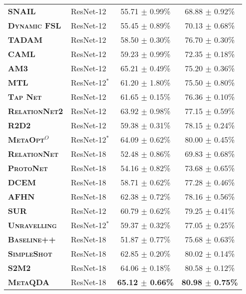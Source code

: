 \documentclass[10pt,twocolumn,letterpaper]{article}
\begin{document}
\begin{table}[h]
{\begin{tabular}{@{} llcc @{}}
\midrule

\textbf{\textsc{SNAIL}} \cite{santoro2017simple} & ResNet-12 & 55.71 $\pm$ 0.99\% & 68.88 $\pm$ 0.92\% \\ 
\textbf{\textsc{Dynamic FSL}} \cite{gidaris2018dynamic} & ResNet-12& 55.45 $\pm$ 0.89\% & 70.13 $\pm$ 0.68\% \\ 
\textbf{\textsc{TADAM}} \cite{oreshkin2018tadam} & ResNet-12 & 58.50 $\pm$ 0.30\% & {76.70 $\pm$ 0.30\%} \\
\textbf{\textsc{CAML}} \cite{jiang2019CAML} & ResNet-12 &  59.23 $\pm$ 0.99\% & 72.35 $\pm$ 0.18\% \\
\textbf{\textsc{AM3}} \cite{xing2019am3} & ResNet-12 & 65.21 $\pm$ 0.49\% & 75.20 $\pm$ 0.36\% \\
\textbf{\textsc{MTL}} \cite{sun2019meta} & ResNet-12$^*$ & 61.20 $\pm$ 1.80\% & 75.50 $\pm$ 0.80\% \\
\textbf{\textsc{Tap Net}} \cite{yoon2019tapnet} & ResNet-12 & 61.65 $\pm$ 0.15\% & 76.36 $\pm$ 0.10\% \\
\textbf{\textsc{RelationNet2}}\cite{xueting2020dcn} & ResNet-12 & 63.92 $\pm$ 0.98\% & 77.15 $\pm$ 0.59\% \\
\textbf{\textsc{R2D2}}\cite{bertinetto2019R2D2} & ResNet-12 & 59.38 $\pm$ 0.31\% & 78.15 $\pm$ 0.24\% \\
\textbf{\textsc{MetaOpt}}$^{O}$ \cite{lee2019meta} & ResNet-12$^*$ & 64.09 $\pm$ 0.62\% & 80.00 $\pm$ 0.45\% \\

\textbf{\textsc{RelationNet}} \cite{chen2019closerfewshot} & ResNet-18 &  52.48 $\pm$ 0.86\% & 69.83 $\pm$ 0.68\% \\
\textbf{\textsc{ProtoNet}} \cite{chen2019closerfewshot} & ResNet-18 &  54.16 $\pm$ 0.82\% & 73.68 $\pm$ 0.65\% \\
\textbf{\textsc{DCEM}} \cite{dvornik2019dcem} & ResNet-18 &  58.71 $\pm$ 0.62\% & 77.28 $\pm$ 0.46\% \\
\textbf{\textsc{AFHN}} \cite{li2020afhn} & ResNet-18 &  62.38 $\pm$ 0.72\% & 78.16 $\pm$ 0.56\% \\

\rowcolor{Gray} \textbf{\textsc{SUR}}\cite{dvornik2020selecting} & ResNet-12 & 60.79 $\pm$ 0.62\% & 79.25 $\pm$ 0.41\% \\
\rowcolor{Gray} \textbf{\textsc{Unravelling}}\cite{goldblum2020unraveling} & ResNet-12$^*$
& {59.37 $\pm$ 0.32\%} & {77.05 $\pm$ 0.25\%} \\
\rowcolor{Gray} \textbf{\textsc{Baseline++}} \cite{chen2019closerfewshot} & ResNet-18 &  51.87 $\pm$ 0.77\% & 75.68 $\pm$ 0.63\% \\ 
\rowcolor{Gray} \textbf{\textsc{SimpleShot}}\cite{wang2019simpleshot} & ResNet-18 & {62.85 $\pm$ 0.20\%} & {80.02 $\pm$ 0.14\%} \\
\rowcolor{Gray} \textbf{\textsc{S2M2}} \cite{mangla2020charting} & ResNet-18 &  64.06 $\pm$ 0.18\% & 80.58 $\pm$ 0.12\% \\
\rowcolor{Gray} \textbf{\textsc{MetaQDA}} & ResNet-18 & \textbf{ 65.12 $\pm$ 0.66\%} & \textbf{80.98 $\pm$ 0.75\%} \\ 


\end{tabular}}
\end{table}
\end{document}
